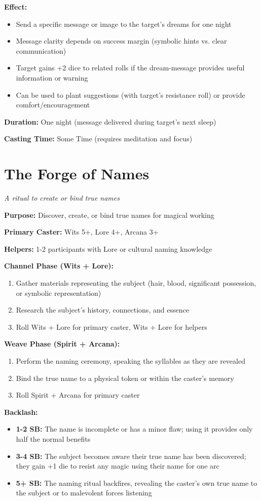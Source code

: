 \textbf{Effect:}
\begin{itemize}
\item Send a specific message or image to the target's dreams for one night
\item Message clarity depends on success margin (symbolic hints vs. clear communication)
\item Target gains +2 dice to related rolls if the dream-message provides useful information or warning
\item Can be used to plant suggestions (with target's resistance roll) or provide comfort/encouragement
\end{itemize}

\textbf{Duration:} One night (message delivered during target's next sleep)

\textbf{Casting Time:} Some Time (requires meditation and focus)

\section*{The Forge of Names}
\textit{A ritual to create or bind true names}

\textbf{Purpose:} Discover, create, or bind true names for magical working

\textbf{Primary Caster:} Wits 5+, Lore 4+, Arcana 3+

\textbf{Helpers:} 1-2 participants with Lore or cultural naming knowledge

\textbf{Channel Phase (Wits + Lore):}
\begin{enumerate}
\item Gather materials representing the subject (hair, blood, significant possession, or symbolic representation)
\item Research the subject's history, connections, and essence
\item Roll Wits + Lore for primary caster, Wits + Lore for helpers
\end{enumerate}

\textbf{Weave Phase (Spirit + Arcana):}
\begin{enumerate}
\item Perform the naming ceremony, speaking the syllables as they are revealed
\item Bind the true name to a physical token or within the caster's memory
\item Roll Spirit + Arcana for primary caster
\end{enumerate}

\textbf{Backlash:}
\begin{itemize}
\item \textbf{1-2 SB:} The name is incomplete or has a minor flaw; using it provides only half the normal benefits
\item \textbf{3-4 SB:} The subject becomes aware their true name has been discovered; they gain +1 die to resist any magic using their name for one arc
\item \textbf{5+ SB:} The naming ritual backfires, revealing the caster's own true name to the subject or to malevolent forces listening
\end{itemize}

